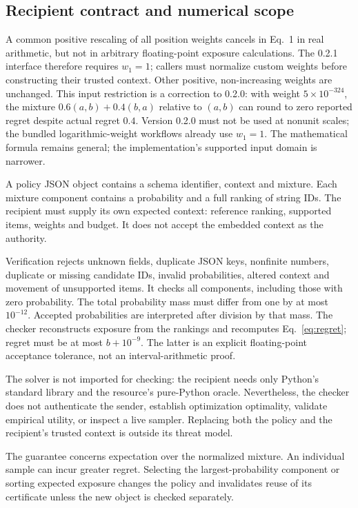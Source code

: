 \documentclass[runningheads]{llncs}
\begin{document}
\subsection{Recipient contract and numerical scope}
A common positive rescaling of all position weights cancels in Eq.~1 in real
arithmetic, but not in arbitrary floating-point exposure calculations.
The 0.2.1 interface therefore requires $w_1=1$; callers must normalize custom
weights before constructing their trusted context. Other positive,
non-increasing weights are unchanged. This input restriction is a
correction to 0.2.0: with weight $5\times10^{-324}$, the mixture
$0.6(a,b)+0.4(b,a)$ relative to $(a,b)$ can round to zero reported regret
despite actual regret $0.4$. Version 0.2.0 must not be used at nonunit scales;
the bundled logarithmic-weight workflows already use $w_1=1$. The mathematical
formula remains general; the implementation's supported input domain is narrower.

A policy JSON object contains a schema identifier, context and mixture.
Each mixture component contains a probability and a full ranking of string
IDs. The recipient must supply its own expected context: reference ranking,
supported items, weights and budget. It does not accept the embedded context
as the authority.

Verification rejects unknown fields, duplicate JSON keys, nonfinite numbers,
duplicate or missing candidate IDs, invalid probabilities, altered context and
movement of unsupported items. It checks all components, including those
with zero probability. The total probability mass must differ from one by
at most $10^{-12}$. Accepted probabilities are interpreted after division by
that mass. The checker reconstructs exposure from the rankings and recomputes
Eq.~\ref{eq:regret}; regret must be at most $b+10^{-9}$.
The latter is an explicit floating-point acceptance tolerance, not an
interval-arithmetic proof.

The solver is not imported for checking: the recipient needs only Python's
standard library and the resource's pure-Python oracle. Nevertheless, the
checker does not authenticate the sender, establish optimization optimality,
validate empirical utility, or inspect a live sampler. Replacing both the
policy and the recipient's trusted context is outside its threat model.

The guarantee concerns expectation over the normalized mixture. An individual
sample can incur greater regret. Selecting the largest-probability component
or sorting expected exposure changes the policy and invalidates reuse of its
certificate unless the new object is checked separately.
\end{document}
